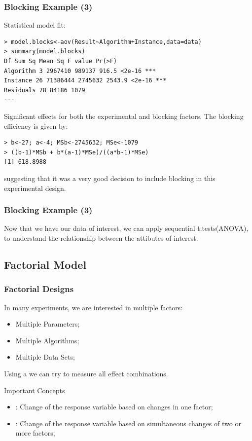 \documentclass[10pt]{beamer}
\begin{document}
\begin{frame}
  \frametitle{Blocking Example (3)}
{\small
  \begin{block}{}
    Statistical model fit:
  \end{block}
\begin{verbatim}
> model.blocks<-aov(Result~Algorithm+Instance,data=data)
> summary(model.blocks)
Df Sum Sq Mean Sq F value Pr(>F)
Algorithm 3 2967410 989137 916.5 <2e-16 ***
Instance 26 71386444 2745632 2543.9 <2e-16 ***
Residuals 78 84186 1079 
---
\end{verbatim}
Significant effects for both the experimental and blocking factors. The
blocking efficiency is given by:
\begin{verbatim}
> b<-27; a<-4; MSb<-2745632; MSe<-1079
> ((b-1)*MSb + b*(a-1)*MSe)/((a*b-1)*MSe)
[1] 618.8988
\end{verbatim}
suggesting that it was a very good decision to include blocking in this
experimental design.}
\end{frame}

\begin{frame}
  \frametitle{Blocking Example (3)} 

  Now that we have our data of interest, we can apply sequential
  t.tests(ANOVA), to understand the relationship between the attibutes
  of interest.
\end{frame}

\subsection{Factorial Model}
\begin{frame}
  \frametitle{Factorial Designs}
  \begin{block}{}
    In many experiments, we are interested in multiple factors:
    \begin{itemize}
    \item Multiple Parameters;
    \item Multiple Algorithms;
    \item Multiple Data Sets;
    \end{itemize}
    Using a  we can try to measure all
    effect combinations.
  \end{block}
  \begin{block}{Important Concepts}
    \begin{itemize}
    \item {}: Change of the response variable
      based on changes in one factor;
    \item {}: Change of the response
      variable based on simultaneous changes of two or more factors;
    \end{itemize}
  \end{block}
\end{frame}
\end{document}
